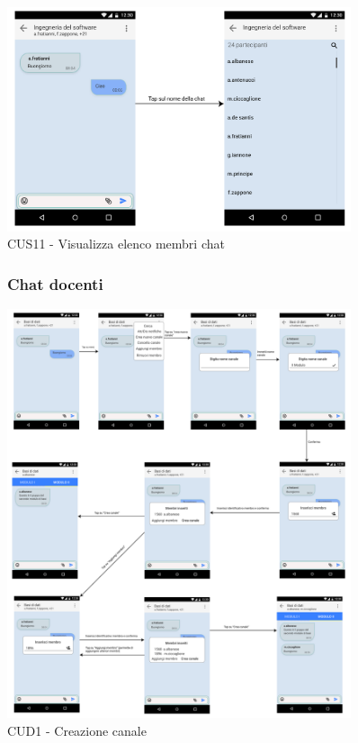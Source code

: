 \begin{figure}
	\centering
	\includegraphics[width=0.9\textwidth]{imgs/gruppo6/activities/act_cus11_elenco_membri.pdf}
	\caption{CUS11 - Visualizza elenco membri chat}
	\label{fig:act-cus11}
\end{figure}

\pagebreak
\begin{figure}[!h]
	\subsubsection{Chat docenti}
	\centering
	\includegraphics[width=0.9\textwidth]{imgs/gruppo6/activities/act_cud1_creazione_canale.pdf}
	\caption{CUD1 - Creazione canale}
	\label{fig:act-cud1}
\end{figure}

